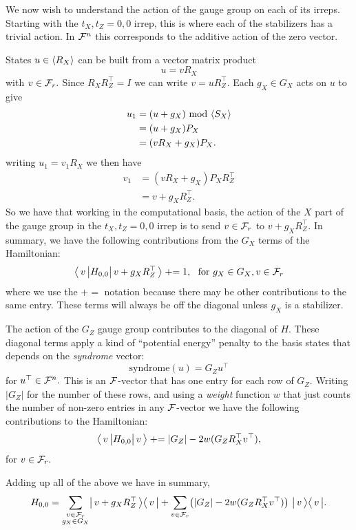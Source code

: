 We now wish to understand the action of the
gauge group on each of its irreps.
Starting with the $t_X,t_Z=0,0$ irrep,
this is where each of the stabilizers has
a trivial action. 
In $\mathcal{F}^n$ this
corresponds to the additive action of the zero vector.

\newcommand{\pluseq}{\mathrel{+}=}
States $u\in\langle R_X \rangle$ can be built from a
vector matrix product
$$
    u = v R_X
$$
with $v\in\mathcal{F}_{r}.$
Since $R_X R_Z^\top = I$
we can write $v = u R_Z^\top.$
Each $g_X\in G_X$ acts on $u$ to give
\begin{align*}
    u_1 &= (u + g_X) \ \mbox{mod}\ \langle S_X \rangle \\
        &= (u + g_X) P_X \\
        &= (v R_X + g_X) P_X.
\end{align*}
writing $u_1 = v_1 R_X$ we then have
\begin{align*}
    v_1 &= (v R_X + g_X) P_X R_Z^\top \\
        &= v + g_X R_Z^\top.
\end{align*}
So we have that working in the computational
basis, the action of the $X$ part of the
gauge group in the $t_X,t_Z=0,0$ irrep is to send
$v\in \mathcal{F}_{r}$ to $v + g_X R_Z^\top.$
In summary, we have the following contributions from the
$G_X$ terms of the Hamiltonian:
$$
    \bbra{v} H_{0,0} \bket{v+g_X  R_Z^\top} 
        \pluseq 1,\ \ \mbox{for}\ g_X\in G_X, v\in \Frd
$$
where we use the $\pluseq$ notation
because there may be other contributions to the
same entry.
These terms will always be off
the diagonal unless $g_X$ is a stabilizer.

The action of the $G_Z$ gauge group
contributes to the diagonal of $H.$
These diagonal terms apply a kind of
``potential energy'' penalty
to the basis states
that depends on the \emph{syndrome} vector:
$$
    \mbox{syndrome}(u) = G_Z u^\top
$$
for $u^\top \in \mathcal{F}^n.$
This is an $\mathcal{F}$-vector that has one entry for
each row of $G_Z.$
Writing $|G_Z|$ for the number of these rows, and 
using a \emph{weight} function $w$ that just counts
the number of non-zero entries in any $\mathcal{F}$-vector
we have the following contributions to
the Hamiltonian:
$$
    \bbra{v} H_{0,0} \bket{v} 
        \pluseq |G_Z| - 2w(G_Z R_X^\top v^\top),
$$
for $v\in \mathcal{F}_{r}.$

Adding up all of the above we
have in summary,
\begin{equation}\label{hamblockgs}
H_{0,0} = \sum_{\substack{v\in\mathcal{F}_{r}\\g_X\in G_X } }
  \bigl|\,{v+g_X  R_Z^\top}\,\bigr\rangle\bigl\langle\,{v}\,\bigr| 
  + \sum_{v\in\mathcal{F}_{r}} \bigl(|G_Z| - 2w(G_Z R_X^\top v^\top)
    \bigr) \ \bigl|\,{v}\,\bigr\rangle\bigl\langle\,{v}\,\bigr|.
\end{equation}

